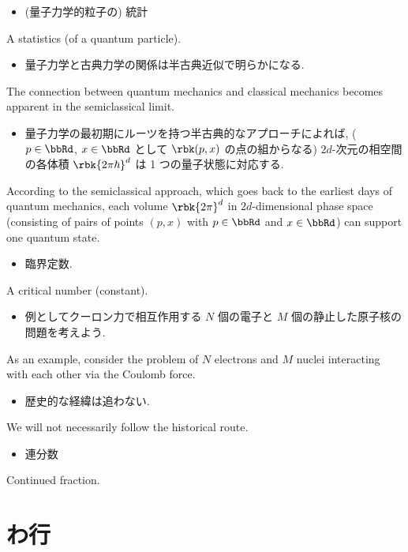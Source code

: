 \documentclass[openany, a4paper, oneside]{jsbook}
\begin{document}
\begin{itemize}
\item (量子力学的粒子の) 統計 \cite{LiebSeiringer1}
\end{itemize}
A statistics (of a quantum particle).

\begin{itemize}
\item 量子力学と古典力学の関係は半古典近似で明らかになる. \cite{LiebSeiringer1}
\end{itemize}
The connection between quantum mechanics and classical mechanics becomes apparent
in the semiclassical limit.

\begin{itemize}
\item 量子力学の最初期にルーツを持つ半古典的なアプローチによれば, ($p \in \bbRd$, $x \in \bbRd$ として $\rbk(p, x)$
  の点の組からなる) $2d$-次元の相空間の各体積 $\rbk{2 \pi \hbar}^d$ は 1 つの量子状態に対応する. \cite{LiebSeiringer1}
\end{itemize}
According to the semiclassical approach, which goes back to the earliest days of quantum mechanics,
each volume $\rbk{2 \pi}^d$ in $2d$-dimensional phase space (consisting of pairs of points
$(p, x)$ with $p \in \bbRd$ and $x \in \bbRd$) can support one quantum state.

\begin{itemize}
\item 臨界定数. \cite{LiebSeiringer1}
\end{itemize}
A critical number (constant).

\begin{itemize}
\item 例としてクーロン力で相互作用する $N$ 個の電子と $M$ 個の静止した原子核の問題を考えよう. \cite{LiebSeiringer1}
\end{itemize}
As an example, consider the problem of $N$ electrons and $M$ nuclei interacting with each other via the Coulomb force.

\begin{itemize}
\item 歴史的な経緯は追わない.
\end{itemize}
We will not necessarily follow the historical route.

\begin{itemize}
\item 連分数
\end{itemize}
Continued fraction.
\section{わ行}
\end{document}
